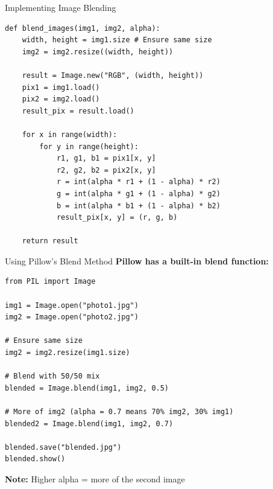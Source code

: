 \documentclass{csbeamer}
\begin{document}
\begin{frame}[fragile]{Implementing Image Blending}
    \begin{lstlisting}
def blend_images(img1, img2, alpha):
    width, height = img1.size # Ensure same size
    img2 = img2.resize((width, height))

    result = Image.new("RGB", (width, height))
    pix1 = img1.load()
    pix2 = img2.load()
    result_pix = result.load()

    for x in range(width):
        for y in range(height):
            r1, g1, b1 = pix1[x, y]
            r2, g2, b2 = pix2[x, y]
            r = int(alpha * r1 + (1 - alpha) * r2)
            g = int(alpha * g1 + (1 - alpha) * g2)
            b = int(alpha * b1 + (1 - alpha) * b2)
            result_pix[x, y] = (r, g, b)

    return result
    \end{lstlisting}
\end{frame}

\begin{frame}[fragile]{Using Pillow's Blend Method}
    \textbf{Pillow has a built-in blend function:}

    \begin{lstlisting}
from PIL import Image

img1 = Image.open("photo1.jpg")
img2 = Image.open("photo2.jpg")

# Ensure same size
img2 = img2.resize(img1.size)

# Blend with 50/50 mix
blended = Image.blend(img1, img2, 0.5)

# More of img2 (alpha = 0.7 means 70% img2, 30% img1)
blended2 = Image.blend(img1, img2, 0.7)

blended.save("blended.jpg")
blended.show()
    \end{lstlisting}

    \vspace{1em}

    \textbf{Note:} Higher alpha = more of the second image
\end{frame}
\end{document}
